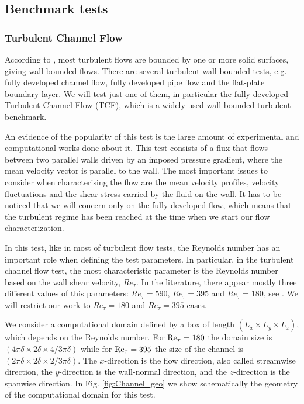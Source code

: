 \subsection{Benchmark tests}
\subsubsection{Turbulent Channel Flow}
According to \cite{pope_turbulent_2000}, most turbulent flows are bounded by one or more solid surfaces, giving wall-bounded flows. There are several turbulent wall-bounded tests, e.g. fully developed channel flow, fully developed pipe flow and the flat-plate boundary layer. We will test just one of them, in particular the fully developed Turbulent Channel Flow (TCF), which is a widely used wall-bounded turbulent benchmark. 

An evidence of the popularity of this test is the large amount of experimental and computational works done about it. This test consists of a flux that flows between two parallel walls driven by an imposed pressure gradient, where the mean velocity vector is parallel to the wall. The most important issues to consider when characterising the flow are the mean velocity profiles, velocity fluctuations and the shear stress carried by the fluid on the wall. It has to be noticed that we will concern only on the fully developed flow, which means that the turbulent regime has been reached at the time when we start our flow characterization.

In this test, like in most of turbulent flow tests, the Reynolds number has an important role when defining the test parameters. In particular, in the turbulent channel flow test, the most characteristic parameter is the Reynolds number based on the wall shear velocity, $Re_\tau$. In the literature, there appear mostly three different values of this parameters: $Re_\tau=590$, $Re_\tau=395$  and $Re_\tau=180$, see \cite{bazilevs_variational_2007, calderer_residual-based_2013, gamnitzer_time-dependent_2010, gravemeier_algebraic_2010, gullbrand_effect_2003, hughes_large_2001, john_variants_2008, kim_turbulence_1987, masud_variational_2011, moser_direct_1999}. We will restrict our work to $Re_\tau=180$ and $Re_\tau=395$ cases.

We consider a computational domain defined by a box of length $(L_x\times L_y\times L_z)$, which depends on the Reynolds number. For ${\rm Re}_\tau=180$ the domain size is $(4\pi\delta\times 2\delta\times 4/3\pi\delta)$ while for  ${\rm Re}_\tau=395$ the size of the channel is $(2\pi\delta\times 2\delta\times 2/3\pi\delta)$. The $x$-direction is the flow direction, also called streamwise direction, the $y$-direction is the wall-normal direction, and the $z$-direction is the spanwise direction. In Fig. \ref{fig:Channel_geo} we show schematically the geometry of the computational domain for this test.

